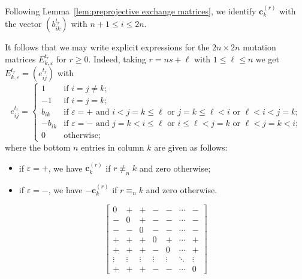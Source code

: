 \documentclass{amsart}
\numberwithin{theorem}{section}
\newcommand{\bfc}{\boldsymbol{c}}
\begin{document}
  Following Lemma~\ref{lem:preprojective exchange matrices}, we identify $\bfc^{(r)}_k$ with the vector $(b^{t_r}_{ik})$ with $n+1\le i\le 2n$.

  It follows that we may write explicit expressions for the $2n\times 2n$ mutation matrices $E^{t_r}_{k,\varepsilon}$ for $r\ge0$.
  Indeed, taking $r=ns+\ell$ with $1 \le \ell \le n$ we get $E^{t_r}_{k,\varepsilon}=(e^{t_r}_{ij})$ with
  \begin{equation}
    \label{eq:preprojective mutation matrices}
    e^{t_r}_{ij}=\begin{cases} 1 & \text{if $i=j\ne k$;}\\ -1 & \text{if $i=j=k$;}\\ b_{ik} & \text{if $\varepsilon=+$ and $i<j=k\le\ell$ or $j=k\le\ell<i$ or $\ell<i<j=k$;}\\ -b_{ik} & \text{if $\varepsilon=-$ and $j=k<i\le\ell$ or $i\le\ell<j=k$ or $\ell<j=k<i$;} \\ 0 & \text{otherwise;} \end{cases}
  \end{equation}
  where the bottom $n$ entries in column $k$ are given as follows:
  \begin{itemize}
    \item if $\varepsilon=+$, we have $\bfc^{(r)}_k$ if $r\not\equiv_n k$ and zero otherwise;
    \item if $\varepsilon=-$, we have $-\bfc^{(r)}_k$ if $r\equiv_n k$ and zero otherwise.
  \end{itemize}

  \[
    \left[\begin{array}{cc|c|cccc}
      0 & + & + & - & - & \cdots & -\\
      - & 0 & + & - & - & \cdots & -\\
      \hline
      - & - & 0 & - & - & \cdots & -\\
      \hline
      + & + & + & 0 & + & \cdots & +\\
      + & + & + & - & 0 & \cdots & +\\
      \vdots & \vdots & \vdots & \vdots & \vdots & \ddots & \vdots\\
      + & + & + & - & - & \cdots & 0
    \end{array}\right]
  \]
\end{document}
